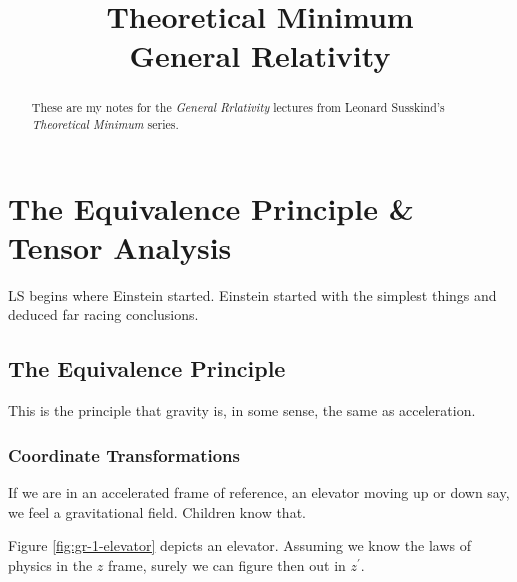 \documentclass[]{article}
\title{Theoretical Minimum\\General Relativity}
\author{}
\begin{document}
\maketitle

\begin{abstract}
	These are my notes for the \emph{General Rrlativity}\cite{susskind2012general} lectures from Leonard Susskind's \emph{Theoretical Minimum} series\cite{susskind2007theoretical}.
\end{abstract}

\tableofcontents
\listoffigures
\listoftables
\listoftheorems

\section{The Equivalence Principle \& Tensor Analysis}

LS begins where Einstein started. Einstein started with the simplest things and deduced far racing conclusions.

\subsection{The Equivalence Principle}

This is the principle that gravity is, in some sense, the same as acceleration.

\subsubsection{Coordinate Transformations}

If we are in an accelerated frame of reference, an elevator moving up or down say, we feel a gravitational field. Children know that.

Figure \ref{fig:gr-1-elevator} depicts an elevator. Assuming we know the laws of physics in the $z$ frame, surely we can figure then out in $z^\prime$.
\end{document}
